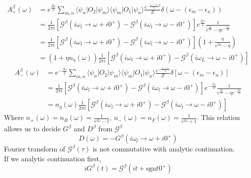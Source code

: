\documentclass[a4paper,11pt]{article}
\begin{document}
\begin{equation*}
  \begin{split}
     A_+^\beta(\omega)&=e^{\frac{\beta\omega}{2}}\sum_{m,n}\langle\psi_n|O_2|\psi_m\rangle\langle\psi_m|O_1|\psi_n\rangle\frac{e^{-\frac{\epsilon_m+\epsilon_n}{2}\beta}}{Z}\delta(\omega-(\epsilon_m-\epsilon_n))\\
       &=\frac{1}{2\pi i}\left[\mathcal{G}^\beta(i\omega_l\rightarrow\omega+i0^+)-\mathcal{G}^\beta(i\omega_l\rightarrow\omega-i0^+)\right]e^{\frac{\beta\omega}{2}}\frac{1}{e^{\frac{\beta\omega}{2}}-\eta e^{-\frac{\beta\omega}{2}}}\\
       &=\frac{1}{2\pi i}\left[\mathcal{G}^\beta(i\omega_l\rightarrow\omega+i0^+)-\mathcal{G}^\beta(i\omega_l\rightarrow\omega-i0^+)\right]\left(1+\frac{\eta}{e^{\beta\omega}-\eta}\right)\\
       &=(1+\eta n_\eta(\omega))\frac{1}{2\pi i}\left[\mathcal{G}^\beta(i\omega_l\rightarrow\omega+i0^+)-\mathcal{G}^\beta(i\omega_L\rightarrow\omega-i0^+)\right]
  \end{split}
\end{equation*}
\begin{equation*}
  \begin{split}
  A_-^\beta(\omega)&=e^{-\frac{\beta\omega}{2}}\sum_{m,n}\langle\psi_n|O_2|\psi_m\rangle\langle\psi_m|O_1|\psi_n\rangle\frac{e^{-\frac{\epsilon_m+\epsilon_n}{2}}}{Z}\delta[\omega-(\epsilon_m-\epsilon_n)]\\
       &=\frac{1}{2\pi i}[\mathcal{G}^\beta(i\omega_l\rightarrow\omega+i0^+)-\mathcal{G}^\beta(i\omega_l\rightarrow\omega-i0^+)]e^{-\frac{\beta\omega}{2}}\frac{1}{e^{\frac{\beta\omega}{2}}-\eta e^{-\frac{\beta\omega}{2}}}\\
       &=n_\eta(\omega)\frac{1}{2\pi i}[\mathcal{G}^\beta(i\omega_l\rightarrow\omega+i0^+)-\mathcal{G}^\beta(i\omega_l\rightarrow\omega-i0^+)]
  \end{split}
\end{equation*}
Where $n_+(\omega)=n_B(\omega)=\frac{1}{e^{\beta\omega}-1},\,n_-(\omega)=n_F(\omega)=\frac{1}{e^{\beta\omega}+1}$. This relation allows us to decide $G^\beta$ and $D^\beta$ from $\mathcal{G}^\beta$
\begin{equation*}
  D(\omega)=-G^\beta(i\omega_l\rightarrow\omega+i0^+)
\end{equation*}
Fourier transform of $\mathcal{G}^\beta(\tau)$ is not commutative with analytic continuation.\\
If we analytic continuation first,
\begin{equation*}
  iG^\beta(t)=\mathcal{G}^\beta(it+\mathrm{sgn}t0^+)
\end{equation*}
\end{document}
